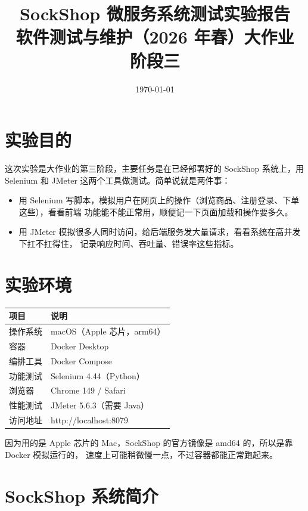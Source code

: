 \documentclass[11pt,a4paper]{ctexart}
\title{\textbf{SockShop 微服务系统测试实验报告}\\[4pt]
\large 软件测试与维护（2026 年春）大作业 \quad 阶段三}
\author{}
\date{\today}
\begin{document}
\maketitle

\section{实验目的}

这次实验是大作业的第三阶段，主要任务是在已经部署好的 SockShop 系统上，用 Selenium 和 JMeter
这两个工具做测试。简单说就是两件事：

\begin{itemize}[leftmargin=2em]
  \item 用 Selenium 写脚本，模拟用户在网页上的操作（浏览商品、注册登录、下单这些），看看前端
  功能能不能正常用，顺便记一下页面加载和操作要多久。
  \item 用 JMeter 模拟很多人同时访问，给后端服务发大量请求，看看系统在高并发下扛不扛得住，
  记录响应时间、吞吐量、错误率这些指标。
\end{itemize}

\section{实验环境}

\begin{table}[H]
\centering
\begin{tabularx}{\textwidth}{lX}
\toprule
\textbf{项目} & \textbf{说明} \\
\midrule
操作系统 & macOS（Apple 芯片，arm64） \\
容器 & Docker Desktop \\
编排工具 & Docker Compose \\
功能测试 & Selenium 4.44（Python） \\
浏览器 & Chrome 149 / Safari \\
性能测试 & JMeter 5.6.3（需要 Java） \\
访问地址 & http://localhost:8079 \\
\bottomrule
\end{tabularx}
\end{table}

因为用的是 Apple 芯片的 Mac，SockShop 的官方镜像是 amd64 的，所以是靠 Docker 模拟运行的，
速度上可能稍微慢一点，不过容器都能正常跑起来。

\section{SockShop 系统简介}
\end{document}
